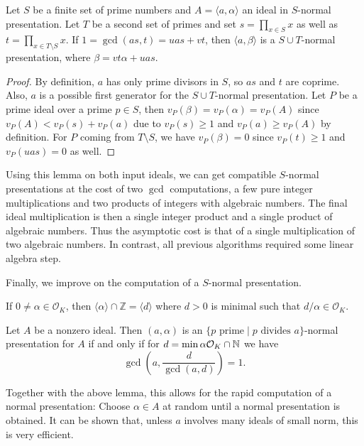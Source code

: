 \documentclass{sig-alternate-05-2015}
\begin{document}
\begin{lemma}
Let $S$ be a finite set of prime numbers and $A=\langle a, \alpha\rangle$ an ideal in
$S$-normal presentation. Let $T$ be a second set of primes and set
$s = \prod_{x\in S} x$ as well as $t = \prod_{x\in T\setminus S} x$. If $1 = \gcd(as, t) = uas + vt$,
then $\langle a, \beta \rangle$ is a $S\cup T$-normal presentation, where $\beta = vt\alpha + uas$.
\end{lemma}

\begin{proof}
By definition, $a$ has only prime divisors in $S$, so $as$ and $t$ are coprime.
Also, $a$ is a possible first generator for the $S\cup T$-normal presentation.
Let $P$ be a prime ideal over a prime $p\in S$, then
$v_P(\beta) = v_P(\alpha)= v_P(A)$ since $v_P(A) <v_P(s)+v_P(a)$ due to $v_P(s)\ge 1$ and $v_P(a) \ge v_P(A)$ by definition.
For $P$ coming from $T\setminus S$, we have $v_P(\beta) = 0$ since $v_P(t)\ge 1$ and $v_P(uas) = 0$ as well.
\end{proof}

Using this lemma on both input ideals, we can get compatible $S$-normal 
presentations at the cost of two $\gcd$ computations, a few pure integer multiplications and two products of integers with algebraic numbers. The final ideal
multiplication is then a single integer product and a single product of
algebraic numbers. Thus the asymptotic cost is that of a single multiplication of two algebraic numbers.
In contrast, all previous algorithms required some linear algebra step.

Finally, we improve on the computation of a $S$-normal presentation.

\begin{lemma}
If $0\ne\alpha\in \mathcal O_K$, then $\langle\alpha\rangle\cap \mathbb Z = \langle d\rangle$ where $d>0$ is minimal such that $d/\alpha\in \mathcal O_K$.
\end{lemma}

\begin{theorem}
Let $A$ be a nonzero ideal. Then
$(a, \alpha)$ is an $\{p \text{ prime} \mid p \text{ divides }a\}$-normal presentation for $A$ if and only if
for $d = \min \alpha\mathcal O_K \cap \mathbb{N}$ we have
\[ \gcd(a, \frac{d}{\gcd(a, d)}) = 1.\]
\end{theorem}

Together with the above lemma, this allows for the rapid computation of a
normal presentation: Choose $\alpha\in A$ at random until a normal presentation
is obtained. It can be shown that, unless $a$ involves many ideals of small
norm, this is very efficient.
\end{document}
